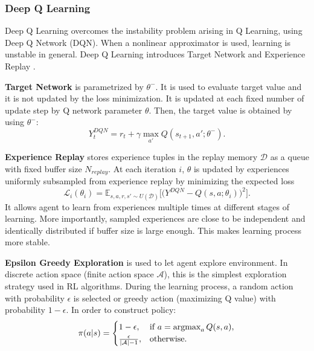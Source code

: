\subsubsection{Deep Q Learning}
Deep Q Learning overcomes the instability problem arising in Q Learning, using Deep Q Network (DQN). 
When a nonlinear approximator is used, learning is unstable in general. 
Deep Q Learning introduces Target Network and Experience Replay \cite{mnih_human-level_2015, mnih_playing_2013}. 

\textbf{Target Network} is parametrized by $\theta^-$. 
It is used to evaluate target value and it is not updated by the loss minimization. 
It is updated at each fixed number of update step by Q network parameter $\theta$. 
Then, the target value is obtained by using $\theta^-$: 
\begin{equation}
\label{eqn:dqn_ntarget}
Y_t^{DQN} = r_t + \gamma \max_{a'} Q(s_{t+1},a';\theta^-).
\end{equation}

\textbf{Experience Replay} stores experience tuples in the replay memory $\mathcal{D}$ as a queue with fixed buffer size $N_{replay}$. 
At each iteration $i$, $\theta$ is updated by experiences uniformly subsampled from experience replay by minimizing the expected loss
\begin{equation}
\label{eqn:dqn_loss}
\mathcal{L}_i(\theta_i) = \mathbb{E}_{s,a,r,s'\sim U(\mathcal{D})}\Big[\big( Y^{DQN} - Q(s,a;\theta_i) \big) ^ 2 \Big].
\end{equation}
It allows agent to learn from experiences multiple times at different stages of learning. More importantly, sampled experiences are close to be independent and identically distributed if buffer size is large enough. 
This makes learning process more stable. 

\textbf{Epsilon Greedy Exploration} is used to let agent explore environment. 
In discrete action space (finite action space $\mathcal{A}$), this is 
the simplest exploration strategy used in RL algorithms.
During the learning process, a random action with probability $\epsilon$ is selected or greedy action (maximizing Q value) with probability $1-\epsilon$. In order to construct policy:   
\begin{equation}
\label{eqn:egreedy_policy}
\pi(a|s) = 
\begin{cases}
1-\epsilon,   & \text{if } a = \operatorname{\textup{argmax}}_{a} Q(s, a), \\
\frac{\epsilon}{|\mathcal{A}|-1},     & \text{otherwise}.
\end{cases}
\end{equation}

